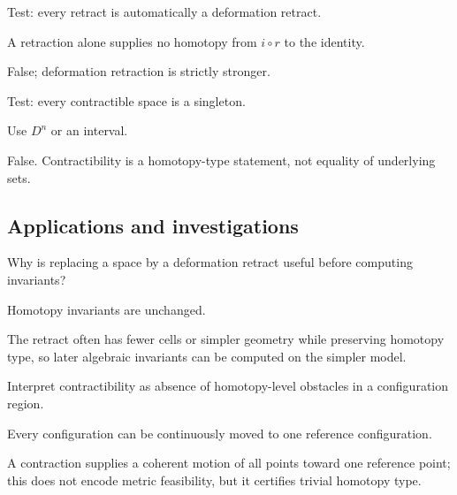 \begin{exercise}\label{exr:viii02-ped-11}
Test: every retract is automatically a deformation retract.
\end{exercise}
\begin{hint}
A retraction alone supplies no homotopy from $i\circ r$ to the identity.
\end{hint}
\begin{solution}
False; deformation retraction is strictly stronger.
\end{solution}

\begin{exercise}\label{exr:viii02-ped-12}
Test: every contractible space is a singleton.
\end{exercise}
\begin{hint}
Use $D^n$ or an interval.
\end{hint}
\begin{solution}
False.  Contractibility is a homotopy-type statement, not equality of underlying sets.
\end{solution}

\subsection*{Applications and investigations}

\begin{exercise}\label{exr:viii02-ped-13}
Why is replacing a space by a deformation retract useful before computing invariants?
\end{exercise}
\begin{hint}
Homotopy invariants are unchanged.
\end{hint}
\begin{solution}
The retract often has fewer cells or simpler geometry while preserving homotopy type, so later algebraic invariants can be computed on the simpler model.
\end{solution}

\begin{exercise}\label{exr:viii02-ped-14}
Interpret contractibility as absence of homotopy-level obstacles in a configuration region.
\end{exercise}
\begin{hint}
Every configuration can be continuously moved to one reference configuration.
\end{hint}
\begin{solution}
A contraction supplies a coherent motion of all points toward one reference point; this does not encode metric feasibility, but it certifies trivial homotopy type.
\end{solution}

